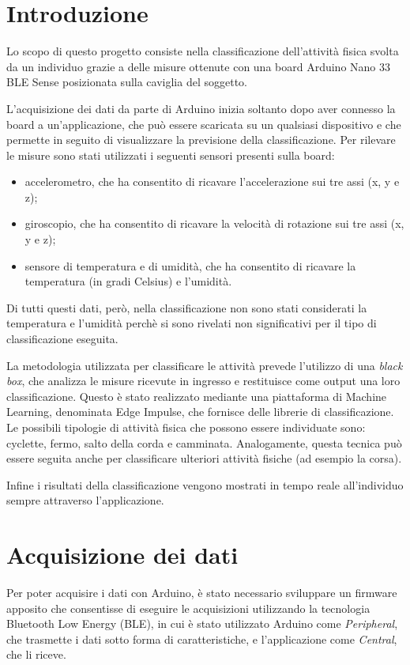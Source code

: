 \section{Introduzione}
Lo scopo di questo progetto consiste nella classificazione dell'attività fisica svolta da un individuo grazie a delle misure ottenute con una board Arduino Nano 33 BLE Sense posizionata sulla caviglia del soggetto. 




L'acquisizione dei dati da parte di Arduino inizia soltanto dopo aver connesso la board a un'applicazione, che può essere scaricata su un qualsiasi dispositivo e che permette in seguito di visualizzare la previsione della classificazione. Per rilevare le misure sono stati utilizzati i seguenti sensori presenti sulla board:
\begin{itemize}
	\item accelerometro, che ha consentito di ricavare l'accelerazione sui tre assi (x, y e z);
	\item giroscopio, che ha consentito di ricavare la velocità di rotazione sui tre assi (x, y e z);
	\item sensore di temperatura e di umidità, che ha consentito di ricavare la temperatura (in gradi Celsius) e l'umidità.
\end{itemize}
Di tutti questi dati, però, nella classificazione non sono stati considerati la temperatura e l'umidità perchè si sono rivelati non significativi per il tipo di classificazione eseguita.


La metodologia utilizzata per classificare le attività prevede l'utilizzo di una \textit{black box}, che analizza le misure ricevute in ingresso e restituisce come output una loro classificazione. Questo è stato realizzato mediante una piattaforma di Machine Learning, denominata Edge Impulse, che fornisce delle librerie di classificazione. Le possibili tipologie di attività fisica che possono essere individuate sono: cyclette, fermo, salto della corda e camminata. Analogamente, questa tecnica può essere seguita anche per classificare ulteriori attività fisiche (ad esempio la corsa).

Infine i risultati della classificazione vengono mostrati in tempo reale all'individuo sempre attraverso l'applicazione.

\section{Acquisizione dei dati}
Per poter acquisire i dati con Arduino, è stato necessario sviluppare un firmware apposito che consentisse di eseguire le acquisizioni utilizzando la tecnologia Bluetooth Low Energy (BLE), in cui è stato utilizzato Arduino come \textit{Peripheral}, che trasmette i dati sotto forma di caratteristiche, e l'applicazione come \textit{Central}, che li riceve.

